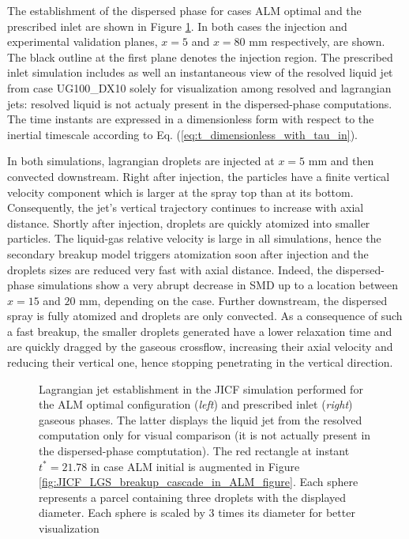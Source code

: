 The establishment of the dispersed phase for cases ALM optimal and the prescribed inlet are shown in Figure \ref{fig:JICF_LGS_spray_establishment}. In both cases  the injection and experimental validation planes, $x = 5$ and $x = 80$ mm respectively, are shown. The black outline at the first plane denotes the injection region. The prescribed inlet simulation includes as well an instantaneous view of the resolved liquid jet from case UG100\_DX10 solely for visualization among resolved and lagrangian jets: resolved liquid is not actualy present in the dispersed-phase computations. The time instants are expressed in a dimensionless form with respect to the inertial timescale according to Eq. (\ref{eq:t_dimensionless_with_tau_in}).




In both simulations, lagrangian droplets are injected at $x = 5$ mm and then convected downstream. Right after injection, the particles have a finite vertical velocity component which is larger at the spray top than at its bottom.  Consequently, the jet's vertical trajectory continues to increase with axial distance. Shortly after injection, droplets are quickly atomized into smaller particles. The liquid-gas relative velocity is large in all simulations, hence the secondary breakup model triggers atomization soon after injection and the droplets sizes are reduced very fast with axial distance. Indeed, the dispersed-phase simulations show a very abrupt decrease in SMD up to a location between $x = 15$ and $20$ mm, depending on the case. Further downstream, the dispersed spray is fully atomized and droplets are only convected. As a consequence of such a fast breakup, the smaller droplets generated have a lower relaxation time and are quickly dragged by the gaseous crossflow, increasing their axial velocity and reducing their vertical one, hence stopping penetrating in the vertical direction. \clearpage


\begin{figure}[h!]
	\centering	{}
	\caption[Lagrangian jet establishment in the JICF simulation performed for the ALM optimal and prescribed inlet gaseous phases]{Lagrangian jet establishment in the JICF simulation performed for the ALM optimal configuration (\textsl{left}) and prescribed inlet (\textsl{right}) gaseous phases. The latter displays the liquid jet from the resolved computation only for visual comparison (it is not actually present in the dispersed-phase comptutation). The red rectangle at instant $t^* = 21.78$ in case ALM initial is augmented in Figure \ref{fig:JICF_LGS_breakup_cascade_in_ALM_figure}. Each sphere represents a parcel containing three droplets with the displayed diameter. Each sphere is scaled by 3 times its diameter for better visualization}
	\label{fig:JICF_LGS_spray_establishment}
\end{figure}



